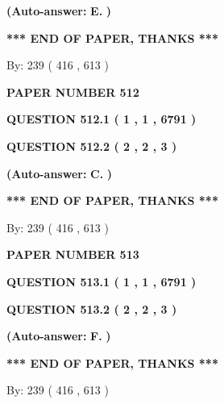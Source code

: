 \documentclass[12pt]{article}
\begin{document}
 
{\textbf{(Auto-answer:}}
{\textbf{\large{
E.}}}
{\textbf{)}}
 
 
   
   
   
   
\vspace{1.0in} 
{\textbf{\large{ *** END OF PAPER, THANKS *** }}} 
   
   
\hspace{1.0in} By: 
 239 ( 416 ,  613 )
   
   
   
   
\newpage 
\setcounter{page}{ 
   512001 } 
   
   
 {\textbf{ \Large{ PAPER NUMBER  512  }}}
   
   
   
   
  
  
{\textbf{\large{QUESTION
512.1 
 ( 1 , 1 , 6791 )
}}}
  
  
{\textbf{\large{QUESTION
512.2 
 ( 2 , 2 , 3 )
}}}
 
 
{\textbf{(Auto-answer:}}
{\textbf{\large{
C.}}}
{\textbf{)}}
 
 
   
   
   
   
\vspace{1.0in} 
{\textbf{\large{ *** END OF PAPER, THANKS *** }}} 
   
   
\hspace{1.0in} By: 
 239 ( 416 ,  613 )
   
   
   
   
\newpage 
\setcounter{page}{ 
   513001 } 
   
   
 {\textbf{ \Large{ PAPER NUMBER  513  }}}
   
   
   
   
  
  
{\textbf{\large{QUESTION
513.1 
 ( 1 , 1 , 6791 )
}}}
  
  
{\textbf{\large{QUESTION
513.2 
 ( 2 , 2 , 3 )
}}}
 
 
{\textbf{(Auto-answer:}}
{\textbf{\large{
F.}}}
{\textbf{)}}
 
 
   
   
   
   
\vspace{1.0in} 
{\textbf{\large{ *** END OF PAPER, THANKS *** }}} 
   
   
\hspace{1.0in} By: 
 239 ( 416 ,  613 )
   
   
   
   
\newpage 
\setcounter{page}{ 
   514001 } 
   
\end{document}
